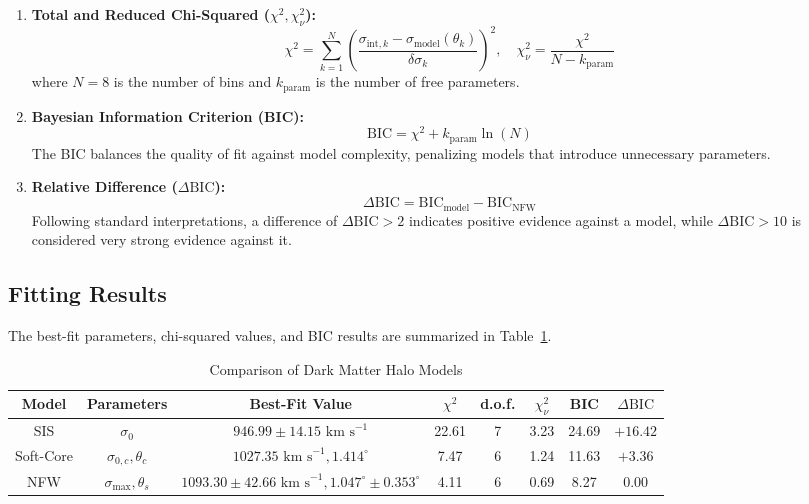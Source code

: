 \documentclass[twocolumn]{aastex631}
\begin{document}
\begin{enumerate}
	\item \textbf{Total and Reduced Chi-Squared ($\chi^2, \chi_\nu^2$):}
	\begin{equation}
		\chi^2 = \sum_{k=1}^N \left(\frac{\sigma_{\text{int}, k} - \sigma_{\text{model}}(\theta_k)}{\delta\sigma_k}\right)^2, \quad \chi_\nu^2 = \frac{\chi^2}{N - k_{\text{param}}}
	\end{equation}
	where $N = 8$ is the number of bins and $k_{\text{param}}$ is the number of free parameters.

	\item \textbf{Bayesian Information Criterion (BIC):}
	\begin{equation}
		\text{BIC} = \chi^2 + k_{\text{param}} \ln(N)
	\end{equation}
	The BIC balances the quality of fit against model complexity, penalizing models that introduce unnecessary parameters.

	\item \textbf{Relative Difference ($\Delta\text{BIC}$):}
	\begin{equation}
		\Delta\text{BIC} = \text{BIC}_{\text{model}} - \text{BIC}_{\text{NFW}}
	\end{equation}
	Following standard interpretations, a difference of $\Delta\text{BIC} > 2$ indicates positive evidence against a model, while $\Delta\text{BIC} > 10$ is considered very strong evidence against it.
\end{enumerate}

\subsection{Fitting Results}
The best-fit parameters, chi-squared values, and BIC results are summarized in Table~\ref{tab:model_comparison}.

\begin{table}[ht!]
	\centering
	\caption{Comparison of Dark Matter Halo Models}
	\label{tab:model_comparison}
	\begin{tabular}{cccccccc}
		\hline \hline
		Model & Parameters & Best-Fit Value & $\chi^2$ & d.o.f. & $\chi_\nu^2$ & BIC & $\Delta\text{BIC}$ \\
		\hline
		SIS       & $\sigma_0$                     & $946.99 \pm 14.15\text{ km s}^{-1}$                               & 22.61 & 7 & 3.23 & 24.69 & $+16.42$ \\
		Soft-Core & $\sigma_{0,c}, \theta_c$       & $1027.35\text{ km s}^{-1}, 1.414^\circ$                           & 7.47  & 6 & 1.24 & 11.63 & $+3.36$  \\
		NFW       & $\sigma_{\text{max}}, \theta_s$ & $1093.30 \pm 42.66\text{ km s}^{-1}, 1.047^\circ \pm 0.353^\circ$ & 4.11  & 6 & 0.69 & 8.27  & $0.00$   \\
		\hline
	\end{tabular}
\end{table}
\end{document}
